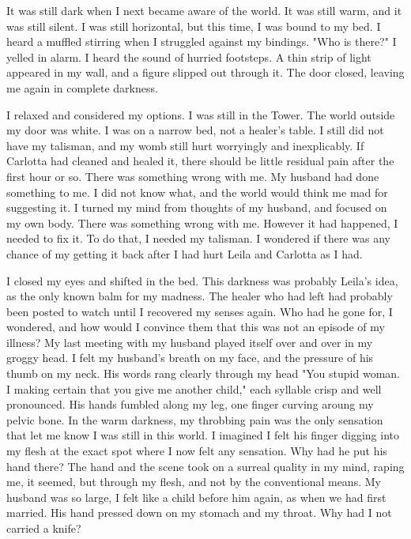 \documentclass{article}
\begin{document}
\vspace{.5cm}

It was still dark when I next became aware of the world. It was still warm, and it was still silent. I was still horizontal, but this time, I was bound to my bed. I heard a muffled stirring when I struggled against my bindings. "Who is there?" I yelled in alarm. I heard the sound of hurried footsteps. A thin strip of light appeared in my wall, and a figure slipped out through it. The door closed, leaving me again in complete darkness.

I relaxed and considered my options. I was still in the Tower. The world outside my door was white. I was on a narrow bed, not a healer's table. I still did not have my talisman, and my womb still hurt worryingly and inexplicably. If Carlotta had cleaned and healed it, there should be little residual pain after the first hour or so. There was something wrong with me. My husband had done something to me. I did not know what, and the world would think me mad for suggesting it. I turned my mind from thoughts of my husband, and focused on my own body. There was something wrong with me. However it had happened, I needed to fix it. To do that, I needed my talisman. I wondered if there was any chance of my getting it back after I had hurt Leila and Carlotta as I had.

I closed my eyes and shifted in the bed. This darkness was probably Leila's idea, as the only known balm for my madness. The healer who had left had probably been posted to watch until I recovered my senses again. Who had he gone for, I wondered, and how would I convince them that this was not an episode of my illness? My last meeting with my husband played itself over and over in my groggy head. I felt my husband's breath on my face, and the pressure of his thumb on my neck. His words rang clearly through my head "You stupid woman. I making certain that you give me another child," each syllable crisp and well pronounced. His hands fumbled along my leg, one finger curving aroung my pelvic bone. In the warm darkness, my throbbing pain was the only sensation that let me know I was still in this world. I imagined I felt his finger digging into my flesh at the exact spot where I now felt any sensation. Why had he put his hand there? The hand and the scene took on a surreal quality in my mind, raping me, it seemed, but through my flesh, and not by the conventional means. My husband was so large, I felt like a child before him again, as when we had first married. His hand pressed down on my stomach and my throat. Why had I not carried a knife? 
\end{document}
